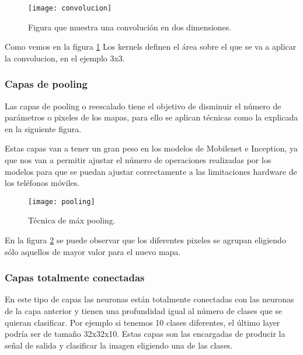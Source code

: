 \begin{figure}[h]
    \begin{center}%
        \begin{center}%
          \texttt{[image: convolucion]}%
          \caption[Convolución de dos dimensiones]{Figura que muestra una convolución en dos dimensiones.}%
          \label{figconvolucion}%
        \end{center}%
  	\end{center}%
\end{figure}%
 
Como vemos en la figura \ref{figconvolucion} Los kernels definen el área sobre el que se va a aplicar la convolucion, en el ejemplo 3x3.

\subsubsection{Capas de pooling}

Las capas de pooling o reescalado tiene el objetivo de disminuir el número de parámetros o pixeles de los mapas, para ello se aplican técnicas como la explicada en la siguiente figura.

Estas capas van a tener un gran peso en los modelos de Mobilenet e Inception, ya que nos van a permitir ajustar el número de operaciones realizadas por los modelos para que se puedan ajustar correctamente a las limitaciones hardware de los teléfonos móviles.

\begin{figure}[h]
    \begin{center}%
        \begin{center}%
          \texttt{[image: pooling]}%
          \caption{Técnica de máx pooling.}%
          \label{figpooling}%
        \end{center}%
  	\end{center}%
\end{figure}%

En la figura \ref{figpooling} se puede observar que los diferentes pixeles se agrupan eligiendo sólo aquellos de mayor valor para el nuevo mapa.

\subsubsection{Capas totalmente conectadas}

En este tipo de capas las neuronas están totalmente conectadas con las neuronas de la capa anterior y tienen una profundidad igual al número de clases que se quieran clasificar. Por ejemplo si tenemos 10 clases diferentes, el último layer podría ser de tamaño 32x32x10. Estas capas son las encargadas de producir la señal de salida y clasificar la imagen eligiendo una de las clases. 

